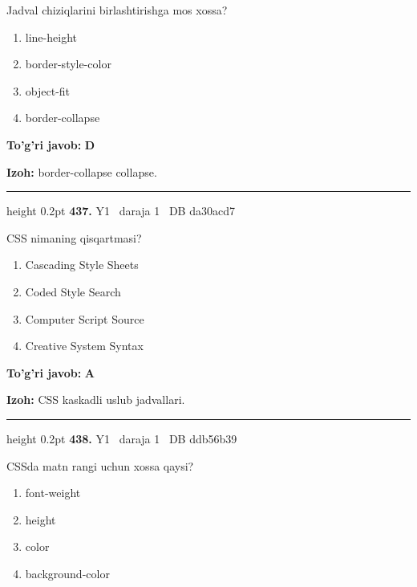 \documentclass[10pt,a4paper,oneside]{article}
\begin{document}
\par
Jadval chiziqlarini birlashtirishga mos xossa?
\begin{enumerate}[label=\Alph*),leftmargin=9mm]
\item line-height
\item border-style-color
\item object-fit
\item border-collapse
\end{enumerate}
\begin{tcolorbox}[enhanced,breakable,colback=teal!4,colframe=teal!45!black,boxrule=0.45pt,arc=1.2mm,left=2.8mm,right=2.8mm,top=2mm,bottom=2mm,before skip=2mm,after skip=2mm]
\textbf{\color{teal}To'g'ri javob:} \textbf{D}
\par\smallskip
\textbf{Izoh:} border-collapse collapse.
\end{tcolorbox}
\vspace{2mm}\hrule height 0.2pt \vspace{4mm}
\hypertarget{q437}{\textbf{\color{ink}437.}}  {\color{muted}\scriptsize Y1 \textbullet\ daraja 1 \textbullet\ DB da30acd7}
\par
CSS nimaning qisqartmasi?
\begin{enumerate}[label=\Alph*),leftmargin=9mm]
\item Cascading Style Sheets
\item Coded Style Search
\item Computer Script Source
\item Creative System Syntax
\end{enumerate}
\begin{tcolorbox}[enhanced,breakable,colback=teal!4,colframe=teal!45!black,boxrule=0.45pt,arc=1.2mm,left=2.8mm,right=2.8mm,top=2mm,bottom=2mm,before skip=2mm,after skip=2mm]
\textbf{\color{teal}To'g'ri javob:} \textbf{A}
\par\smallskip
\textbf{Izoh:} CSS kaskadli uslub jadvallari.
\end{tcolorbox}
\vspace{2mm}\hrule height 0.2pt \vspace{4mm}
\hypertarget{q438}{\textbf{\color{ink}438.}}  {\color{muted}\scriptsize Y1 \textbullet\ daraja 1 \textbullet\ DB ddb56b39}
\par
CSSda matn rangi uchun xossa qaysi?
\begin{enumerate}[label=\Alph*),leftmargin=9mm]
\item font-weight
\item height
\item color
\item background-color
\end{enumerate}
\end{document}
